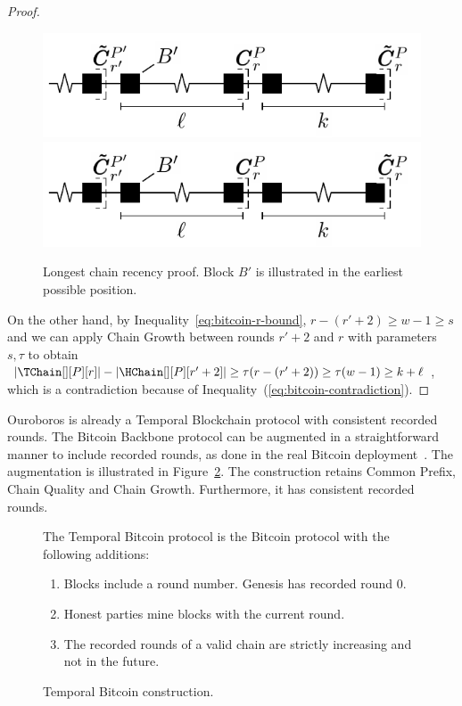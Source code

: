 \begin{proof}
  \begin{figure}
    \centering
    \iflncs
      \includegraphics[width=0.5\columnwidth,keepaspectratio]{figures/longest-chain-proof.pdf}
    \fi
    \ifccs
      \includegraphics[width=0.8\columnwidth,keepaspectratio]{figures/longest-chain-proof.pdf}
    \fi
    \caption{Longest chain recency proof. Block $B'$ is illustrated in the
             earliest possible position.
    }
   \label{fig:longest-chain-recency-proof}
  \end{figure}

  On the other hand, by Inequality~\ref{eq:bitcoin-r-bound}, $r - (r' + 2) \geq w - 1 \geq s$ and
  we can apply Chain Growth between rounds $r' + 2$ and $r$
  with parameters $s, \tau$ to obtain
  $|\TChain[][P][r]| - |\HChain[][P][r' + 2]| \geq \tau(r - (r' + 2)) \geq \tau (w - 1) \geq  k + \ell$,
  which is a contradiction because of Inequality~(\ref{eq:bitcoin-contradiction}).
  \Qed
\end{proof}

Ouroboros is already a Temporal Blockchain protocol with consistent recorded rounds.
The Bitcoin Backbone protocol can be augmented in a
straightforward manner to include recorded rounds, as done in the real Bitcoin deployment~\cite{mastering-bitcoin}.
The augmentation is illustrated in Figure~\ref{fig.temporal-backbone}.
The construction retains Common Prefix, Chain Quality and Chain Growth.
Furthermore, it has consistent recorded rounds.

\begin{figure}
  \begin{mdframed}
    The Temporal Bitcoin protocol is the Bitcoin protocol with
    the following additions:

    \begin{enumerate}
      \item Blocks include a round number. Genesis has recorded round $0$.
      \item Honest parties mine blocks with the current round.
      \item The recorded rounds of a valid chain are strictly increasing and not in the future.
    \end{enumerate}
  \end{mdframed}
  \caption{Temporal Bitcoin construction.}
  \label{fig.temporal-backbone}
\end{figure}

